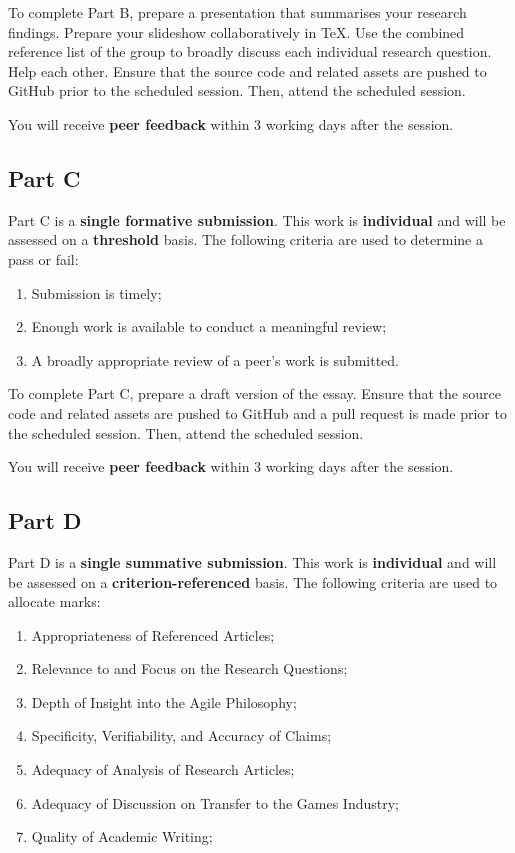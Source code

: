 \documentclass{../fal_assignment}
\begin{document}
To complete Part B, prepare a presentation that summarises your research findings. Prepare your slideshow collaboratively in TeX. Use the combined reference list of the group to broadly discuss each individual research question. Help each other. Ensure that the source code and related assets are pushed to GitHub prior to the scheduled session. Then, attend the scheduled session.

You will receive \textbf{peer feedback} within 3 working days after the session.

\subsection*{Part C}

Part C is a \textbf{single formative submission}. This work is \textbf{individual} and will be assessed on a \textbf{threshold} basis. The following criteria are used to determine a pass or fail:

\begin{enumerate}[label=(\alph*)]
	\item Submission is timely;
	\item Enough work is available to conduct a meaningful review;
	\item A broadly appropriate review of a peer's work is submitted.
\end{enumerate}

To complete Part C, prepare a draft version of the essay. Ensure that the source code and related assets are pushed to GitHub and a pull request is made prior to the scheduled session. Then, attend the scheduled session.

You will receive \textbf{peer feedback} within 3 working days after the session.

\subsection*{Part D}

Part D is a \textbf{single summative submission}. This work is \textbf{individual} and will be assessed on a \textbf{criterion-referenced} basis. The following criteria are used to allocate marks:

\begin{enumerate}[label=(\alph*)]
	\item Appropriateness of Referenced Articles;
	\item Relevance to and Focus on the Research Questions;
	\item Depth of Insight into the Agile Philosophy;
	\item Specificity, Verifiability, and Accuracy of Claims;
	\item Adequacy of Analysis of Research Articles;	
	\item Adequacy of Discussion on Transfer to the Games Industry;
	\item Quality of Academic Writing;
\end{enumerate}
\end{document}
